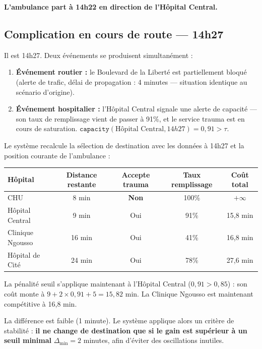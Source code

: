 \documentclass[12pt,a4paper]{article}
\theoremstyle{definition}
\theoremstyle{remark}
\begin{document}
\textbf{L'ambulance part à 14h22 en direction de l'Hôpital Central.}

\subsection{Complication en cours de route — 14h27}

Il est 14h27. Deux événements se produisent simultanément :

\begin{enumerate}[leftmargin=2em]
  \item \textbf{Événement routier :} le Boulevard de la Liberté est
    partiellement bloqué (alerte de trafic, délai de propagation :
    4 minutes — situation identique au scénario d'origine).
  \item \textbf{Événement hospitalier :} l'Hôpital Central signale
    une alerte de capacité — son taux de remplissage vient de passer
    à 91\%, et le service trauma est en cours de saturation.
    $\texttt{capacity}(\text{Hôpital Central}, 14h27) = 0{,}91 > \tau$.
\end{enumerate}

Le système recalcule la sélection de destination avec les données
à 14h27 et la position courante de l'ambulance :

\medskip
\begin{center}
\begin{tabular}{lcccc}
  \toprule
  \textbf{Hôpital} & \textbf{Distance restante} &
  \textbf{Accepte trauma} & \textbf{Taux remplissage} & \textbf{Coût total} \\
  \midrule
  CHU            & 8 min  & \textbf{Non} & 100\% & $+\infty$ \\
  Hôpital Central & 9 min  & Oui & 91\% & 15,8 min \\
  Clinique Ngousso & 16 min & Oui & 41\%  & 16,8 min  \\
  Hôpital de Cité & 24 min & Oui & 78\%  & 27,6 min  \\
  \bottomrule
\end{tabular}
\end{center}
\medskip

La pénalité seuil s'applique maintenant à l'Hôpital Central
($0{,}91 > 0{,}85$) : son coût monte à
$9 + 2 \times 0{,}91 + 5 = 15{,}82$ min.
La Clinique Ngousso est maintenant compétitive à 16,8 min.

La différence est faible (1 minute). Le système applique alors un
critère de stabilité : \textbf{il ne change de destination que si le
gain est supérieur à un seuil minimal} $\Delta_{\min} = 2$ minutes,
afin d'éviter des oscillations inutiles.
\end{document}
